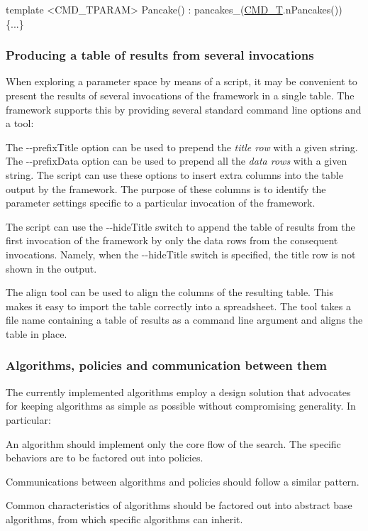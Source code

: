 \begin{DoxyCode}
\textcolor{keyword}{template} <CMD\_TPARAM>
Pancake() : pancakes\_(\hyperlink{command__line_8h_ad2bdd5f5511ceff17570c461fe447a56}{CMD\_T}.nPancakes()) \{...\}
\end{DoxyCode}
\hypertarget{index_s-single}{}\subsubsection{Producing a table of results from several invocations}\label{index_s-single}
When exploring a parameter space by means of a script, it may be convenient to present the results of several invocations of the framework in a single table. The framework supports this by providing several standard command line options and a tool\+:
\begin{DoxyItemize}
\item The {\ttfamily -\/-\/prefix\+Title} option can be used to prepend the {\itshape title row} with a given string. The {\ttfamily -\/-\/prefix\+Data} option can be used to prepend all the {\itshape data rows} with a given string. The script can use these options to insert extra columns into the table output by the framework. The purpose of these columns is to identify the parameter settings specific to a particular invocation of the framework.
\item The script can use the {\ttfamily -\/-\/hide\+Title} switch to append the table of results from the first invocation of the framework by only the data rows from the consequent invocations. Namely, when the {\ttfamily -\/-\/hide\+Title} switch is specified, the title row is not shown in the output.
\item The {\ttfamily align} tool can be used to align the columns of the resulting table. This makes it easy to import the table correctly into a spreadsheet. The tool takes a file name containing a table of results as a command line argument and aligns the table in place.
\end{DoxyItemize}\hypertarget{index_s-crtp}{}\subsubsection{Algorithms, policies and communication between them}\label{index_s-crtp}
The currently implemented algorithms employ a design solution that advocates for keeping algorithms as simple as possible without compromising generality. In particular\+:
\begin{DoxyItemize}
\item An algorithm should implement only the core flow of the search. The specific behaviors are to be factored out into policies.
\item Communications between algorithms and policies should follow a similar pattern.
\item Common characteristics of algorithms should be factored out into abstract base algorithms, from which specific algorithms can inherit.
\end{DoxyItemize}

